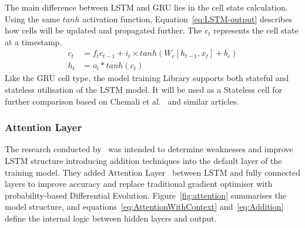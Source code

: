 The main difference between LSTM and GRU lies in the cell state calculation.
Using the same $tanh$ activation function, Equation~\ref{eq:LSTM-output} describes how cells will be updated and propagated further.
The $c_t$ represents the cell state at a timestamp.
\begin{equation}
    \begin{split}
        c_t &= f_t c_{t-1}+i_t \times tanh \left(W_c \left[h_{t-1}, x_t \right] + b_c \right) \\
        h_t &= o_t*tanh \left(c_t \right)
    \end{split}
    \label{eq:LSTM-output}
\end{equation}
Like the GRU cell type, the model training Library supports both stateful and stateless utilisation of the LSTM model.
It will be used as a Stateless cell for further comparison based on Chemali et al.~\cite{Chemali2017} and similar articles.
%
%
\subsubsection{Attention Layer}
The research conducted by~\cite{mamo_long_2020} was intended to determine weaknesses and improve LSTM structure introducing addition techniques into the default layer of the training model. 
They added Attention Layer~\cite{yang_hierarchical_2016} between LSTM and fully connected layers to improve accuracy and replace traditional gradient optimiser with probability-based Differential Evolution.
Figure~\ref{fig:attention} summarises the model structure, and equations~\ref{eq:AttentionWithContext} and~\ref{eq:Addition} define the internal logic between hidden layers and output.

